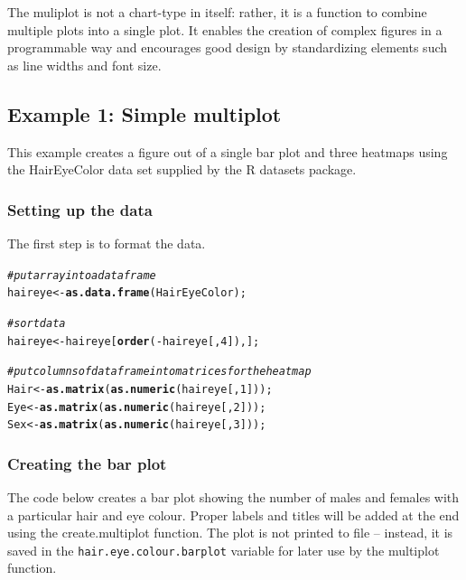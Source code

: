 \documentclass[letterpaper]{report}\usepackage[]{graphicx}\usepackage[]{color}
\makeatletter
\newcommand{\hlnum}[1]{\textcolor[rgb]{0.686,0.059,0.569}{#1}}%
\newcommand{\hlcom}[1]{\textcolor[rgb]{0.678,0.584,0.686}{\textit{#1}}}%
\newcommand{\hlopt}[1]{\textcolor[rgb]{0,0,0}{#1}}%
\newcommand{\hlstd}[1]{\textcolor[rgb]{0.345,0.345,0.345}{#1}}%
\newcommand{\hlkwb}[1]{\textcolor[rgb]{0.69,0.353,0.396}{#1}}%
\newcommand{\hlkwd}[1]{\textcolor[rgb]{0.737,0.353,0.396}{\textbf{#1}}}%
\newenvironment{kframe}{%
 \def\at@end@of@kframe{}%
 \ifinner\ifhmode%
  \def\at@end@of@kframe{\end{minipage}}%
  \begin{minipage}{\columnwidth}%
 \fi\fi%
 \def\FrameCommand##1{\hskip\@totalleftmargin \hskip-\fboxsep
 \colorbox{shadecolor}{##1}\hskip-\fboxsep
     \hskip-\linewidth \hskip-\@totalleftmargin \hskip\columnwidth}%
 \MakeFramed {\advance\hsize-\width
   \@totalleftmargin\z@ \linewidth\hsize
   \@setminipage}}%
 {\par\unskip\endMakeFramed%
 \at@end@of@kframe}
\newenvironment{knitrout}{}{} %
\makeatother
\begin{document}
The muliplot is not a chart-type in itself: rather, it is a function to combine multiple plots into a single plot. It enables the creation of complex figures in a programmable way and encourages good design by standardizing elements such as line widths and font size. 

\subsection{Example 1: Simple multiplot}
This example creates a figure out of a single bar plot and three heatmaps using the HairEyeColor data set supplied by the R datasets package.

\subsubsection{Setting up the data}
The first step is to format the data. 

\begin{knitrout}
\color{fgcolor}\begin{kframe}
\begin{alltt}
\hlcom{# put array into a data frame }
\hlstd{haireye} \hlkwb{<-} \hlkwd{as.data.frame}\hlstd{(HairEyeColor);}

\hlcom{# sort data}
\hlstd{haireye} \hlkwb{<-} \hlstd{haireye[}\hlkwd{order}\hlstd{(}\hlopt{-}\hlstd{haireye[,}\hlnum{4}\hlstd{]),];}

\hlcom{# put columns of data frame into matrices for the heatmap}
\hlstd{Hair} \hlkwb{<-} \hlkwd{as.matrix}\hlstd{(}\hlkwd{as.numeric}\hlstd{(haireye[,}\hlnum{1}\hlstd{]));}
\hlstd{Eye} \hlkwb{<-} \hlkwd{as.matrix}\hlstd{(}\hlkwd{as.numeric}\hlstd{(haireye[,}\hlnum{2}\hlstd{]));}
\hlstd{Sex} \hlkwb{<-} \hlkwd{as.matrix}\hlstd{(}\hlkwd{as.numeric}\hlstd{(haireye[,}\hlnum{3}\hlstd{]));}
\end{alltt}
\end{kframe}
\end{knitrout}

\subsubsection{Creating the bar plot}
The code below creates a bar plot showing the number of males and females with a particular hair and eye colour. Proper labels and titles will be added at the end using the create.multiplot function. The plot is not printed to file -- instead, it is saved in the \verb|hair.eye.colour.barplot| variable for later use by the multiplot function.
\end{document}
